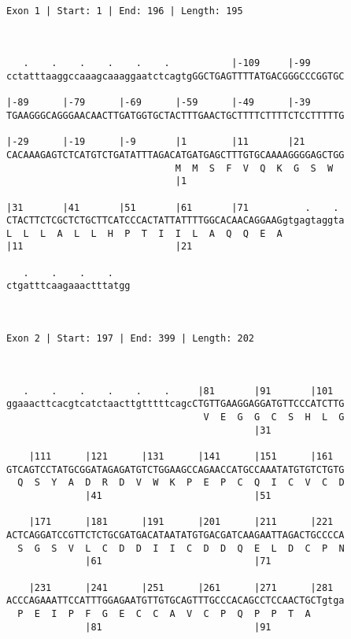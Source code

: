 \documentclass{article}
\begin{document}
 \begin{Verbatim}
 
Exon 1 | Start: 1 | End: 196 | Length: 195



   .    .    .    .    .    .           |-109     |-99      
cctatttaaggccaaagcaaaggaatctcagtgGGCTGAGTTTTATGACGGGCCCGGTGC
                                                            
|-89      |-79      |-69      |-59      |-49      |-39      
TGAAGGGCAGGGAACAACTTGATGGTGCTACTTTGAACTGCTTTTCTTTTCTCCTTTTTG
                                                            
|-29      |-19      |-9       |1        |11       |21       
CACAAAGAGTCTCATGTCTGATATTTAGACATGATGAGCTTTGTGCAAAAGGGGAGCTGG
                              M  M  S  F  V  Q  K  G  S  W  
                              |1                            
  
|31       |41       |51       |61       |71          .    . 
CTACTTCTCGCTCTGCTTCATCCCACTATTATTTTGGCACAACAGGAAGgtgagtaggta
L  L  L  A  L  L  H  P  T  I  I  L  A  Q  Q  E  A           
|11                           |21                           
  
   .    .    .    .   
ctgatttcaagaaactttatgg
                      
                      
 
Exon 2 | Start: 197 | End: 399 | Length: 202



   .    .    .    .    .    .     |81       |91       |101  
ggaaacttcacgtcatctaacttgtttttcagcCTGTTGAAGGAGGATGTTCCCATCTTG
                                   V  E  G  G  C  S  H  L  G
                                            |31             
  
    |111      |121      |131      |141      |151      |161  
GTCAGTCCTATGCGGATAGAGATGTCTGGAAGCCAGAACCATGCCAAATATGTGTCTGTG
  Q  S  Y  A  D  R  D  V  W  K  P  E  P  C  Q  I  C  V  C  D
              |41                           |51             
  
    |171      |181      |191      |201      |211      |221  
ACTCAGGATCCGTTCTCTGCGATGACATAATATGTGACGATCAAGAATTAGACTGCCCCA
  S  G  S  V  L  C  D  D  I  I  C  D  D  Q  E  L  D  C  P  N
              |61                           |71             
  
    |231      |241      |251      |261      |271      |281  
ACCCAGAAATTCCATTTGGAGAATGTTGTGCAGTTTGCCCACAGCCTCCAACTGCTgtga
  P  E  I  P  F  G  E  C  C  A  V  C  P  Q  P  P  T  A      
              |81                           |91             
  

\end{Verbatim}
\end{document}
